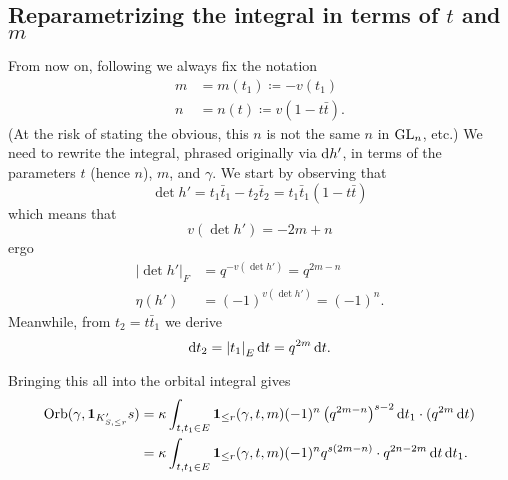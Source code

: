\subsection{Reparametrizing the integral in terms of $t$ and $m$}
From now on, following \cite[\S4]{ref:AFL} we always fix the notation
\begin{align*}
  m &= m(t_1) \coloneqq -v(t_1) \\
  n &= n(t) \coloneqq v(1-t\bar t).
\end{align*}
(At the risk of stating the obvious, this $n$ is not the same $n$ in $\operatorname{GL}_n$, etc.)
We need to rewrite the integral, phrased originally via $\odif{h'}$,
in terms of the parameters $t$ (hence $n$), $m$, and $\gamma$.
We start by observing that
\[ \det h' = t_1 \bar t_1 - t_2 \bar t_2 = t_1 \bar t_1 (1 - t\bar t) \]
which means that
\[ v(\det h') = -2m + n \]
ergo
\begin{align*}
\left\lvert \det h' \right\rvert_F &= q^{-v(\det h')} = q^{2m-n} \\
\eta(h') &= (-1)^{v(\det h')} = (-1)^n.
\end{align*}
Meanwhile, from $t_2 = t \bar t_1$ we derive
\[ \odif t_2 = \left\lvert t_1 \right\rvert_E \odif t = q^{2m} \odif t. \]

Bringing this all into the orbital integral gives
\begin{align*}
  \Orb(\gamma, \mathbf{1}_{K'_{S, \le r}} s)
  &= \kappa \int_{t, t_1 \in E} \mathbf{1}_{\le r}(\gamma, t, m)
  (-1)^n \left( q^{2m-n} \right)^{s-2} \odif t_1 \cdot (q^{2m} \odif t) \\
  &= \kappa \int_{t, t_1 \in E} \mathbf{1}_{\le r}(\gamma, t, m)
  (-1)^n q^{s(2m-n)} \cdot q^{2n-2m} \odif t \odif t_1.
\end{align*}

